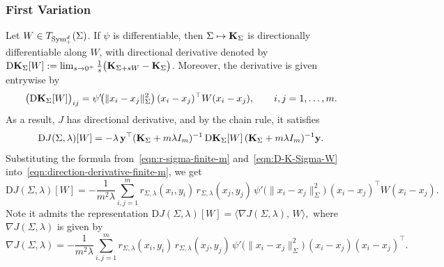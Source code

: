 \documentclass[sn-mathphys-num]{sn-jnl}%
\numberwithin{equation}{section}
\newcommand{\Sym}{{\rm \mathrm{Sym}}}
\theoremstyle{thmstyleone}%
\theoremstyle{thmstyletwo}%
\theoremstyle{thmstylethree}%
\begin{document}
\subsubsection{First Variation} 
Let $W \in T_{\Sym_+^d}(\Sigma)$. If $\psi$ is differentiable, then
$\Sigma \mapsto \mathbf{K}_\Sigma$ is directionally differentiable along $W$, with directional derivative
denoted by 
$
\mathrm{D}\mathbf{K}_\Sigma[W]
:=
\lim_{s\to 0^+}\frac{1}{s}\bigl(\mathbf{K}_{\Sigma+sW}-\mathbf{K}_\Sigma\bigr)$. 
Moreover, the derivative is given entrywise by
\begin{equation}
\label{eqn:D-K-Sigma-W}
	\bigl(\mathrm{D}\mathbf{K}_\Sigma[W]\bigr)_{ij}
	=
	\psi'\!\bigl(\|x_i -x_j\|_\Sigma^2\bigr)\,
	(x_i -x_j)^\top W (x_i -x_j),
	\qquad i,j=1,\ldots,m.
\end{equation}
As a result, $J$ has directional derivative, and by the chain rule, it satisfies 
\begin{equation} 
\label{eqn:direction-derivative-finite-m}
\mathrm{D}J(\Sigma,\lambda)[W] = -\lambda\, \mathbf{y}^\top (\mathbf{K}_\Sigma+m\lambda I_m)^{-1}\, \mathrm{D}\mathbf{K}_\Sigma[W]\, (\mathbf{K}_\Sigma+m\lambda I_m)^{-1}\mathbf{y} . 
\end{equation}
Substituting the formula from~\eqref{eqn:r-sigma-finite-m} and~\eqref{eqn:D-K-Sigma-W} 
into~\eqref{eqn:direction-derivative-finite-m}, we get 
\begin{equation}
\label{eqn:directional-derivative-formula-finite-m}
	\mathrm{D}J(\Sigma,\lambda)[W] =
	-\frac{1}{m^2\lambda}
	\sum_{i,j=1}^m
	r_{\Sigma,\lambda}(x_i,y_i)\,
	r_{\Sigma,\lambda}(x_j,y_j)\,
	\psi'\!\bigl(\|x_i -x_j\|_\Sigma^2\bigr)\,
	(x_i -x_j)^\top W (x_i -x_j).
\end{equation}
Note it admits the representation
$
	\mathrm{D}J(\Sigma,\lambda)[W]
	= \bigl\langle \nabla J(\Sigma,\lambda),\, W \bigr\rangle,
$
where $\nabla J(\Sigma,\lambda)$ is given by
\begin{equation}
\label{eqn:gradient-formula-finite-m}
	\nabla J(\Sigma,\lambda)
	=
	-\frac{1}{m^2\lambda}
	\sum_{i,j=1}^m
	r_{\Sigma,\lambda}(x_i,y_i)\,
	r_{\Sigma,\lambda}(x_j,y_j)\,
	\psi'\!\bigl(\|x_i -x_j\|_\Sigma^2\bigr)\,
	(x_i -x_j) (x_i -x_j)^\top.
\end{equation} 
\end{document}
